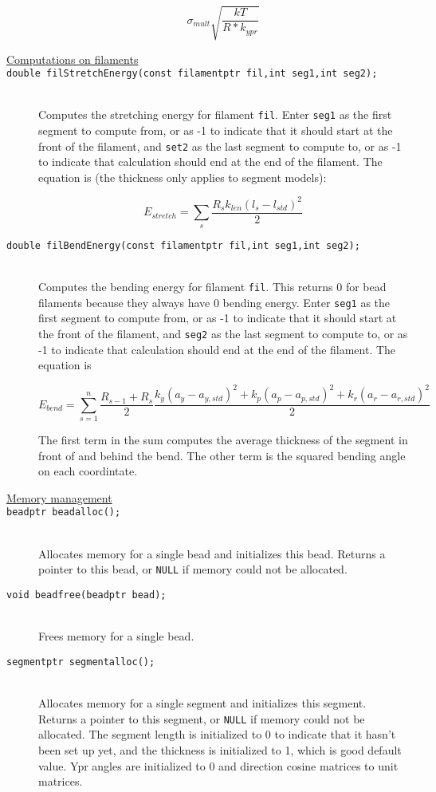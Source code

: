 \documentclass {scrbook}
\newcommand {\ttt} {\texttt}
\begin{document}
\begin{description}
$$\sigma_{mult} \sqrt{\frac{kT}{R*k_{ypr}}}$$


\item[\underline{Computations on filaments}]

\item[\ttt{double filStretchEnergy(const filamentptr fil,int seg1,int seg2);}]
\hfill \\
Computes the stretching energy for filament \ttt{fil}. Enter \ttt{seg1} as the first segment to compute from, or as -1 to indicate that it should start at the front of the filament, and \ttt{set2} as the last segment to compute to, or as -1 to indicate that calculation should end at the end of the filament. The equation is (the thickness only applies to segment models):

$$E_{stretch} = \sum_{s} \frac{R_s k_{len} (l_s - l_{std})^2}{2}$$

\item[\ttt{double filBendEnergy(const filamentptr fil,int seg1,int seg2);}]
\hfill \\
Computes the bending energy for filament \ttt{fil}. This returns 0 for bead filaments because they always have 0 bending energy. Enter \ttt{seg1} as the first segment to compute from, or as -1 to indicate that it should start at the front of the filament, and \ttt{seg2} as the last segment to compute to, or as -1 to indicate that calculation should end at the end of the filament. The equation is

$$E_{bend}=\sum_{s=1}^{n} \frac{R_{s-1}+R_s}{2} \frac{k_y(a_y-a_{y,std})^2+k_p(a_p-a_{p,std})^2+k_r(a_r-a_{r,std})^2}{2}$$

The first term in the sum computes the average thickness of the segment in front of and behind the bend. The other term is the squared bending angle on each coordintate.


\item[\underline{Memory management}]

\item[\ttt{beadptr beadalloc();}]
\hfill \\
Allocates memory for a single bead and initializes this bead. Returns a pointer to this bead, or \ttt{NULL} if memory could not be allocated.

\item[\ttt{void beadfree(beadptr bead);}]
\hfill \\
Frees memory for a single bead.

\item[\ttt{segmentptr segmentalloc();}]
\hfill \\
Allocates memory for a single segment and initializes this segment. Returns a pointer to this segment, or \ttt{NULL} if memory could not be allocated. The segment length is initialized to 0 to indicate that it hasn't been set up yet, and the thickness is initialized to 1, which is good default value. Ypr angles are initialized to 0 and direction cosine matrices to unit matrices.


\end{description}
\end{document}
